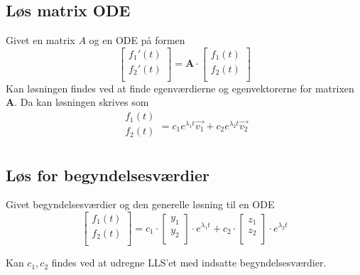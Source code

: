 \subsection{Løs matrix ODE}
Givet en matrix $A$ og en ODE på formen
\[
\begin{bmatrix}
    f_1'(t) \\
    f_2'(t) \\
\end{bmatrix}
=
\textbf{A} \cdot
\begin{bmatrix}
    f_1(t) \\
    f_2(t) \\
\end{bmatrix}
\]
Kan løsningen findes ved at finde egenværdierne og egenvektorerne for matrixen $\mathbf{A}$.
Da kan løsningen skrives som
\[
\begin{split}
    f_1(t) \\
    f_2(t) \\
\end{split}
= c_1 e^{\lambda_1 t} \vec{v_1} + c_2 e^{\lambda_2 t} \vec{v_2}
\]

\subsection{Løs for begyndelsesværdier}
Givet begyndelsesværdier og den generelle løsning til en ODE
\[
\begin{bmatrix}
    f_1(t) \\
    f_2(t) \\
\end{bmatrix}
=
c_1 \cdot
\begin{bmatrix}
    y_1 \\
    y_2 \\
\end{bmatrix}
\cdot e^{\lambda_1 t}
+ c_2 \cdot
\begin{bmatrix}
    z_1 \\
    z_2 \\
\end{bmatrix}
\cdot e^{\lambda_2 t}
\]

Kan $c_1, c_2$ findes ved at udregne LLS'et med indsatte begyndelsesværdier.

